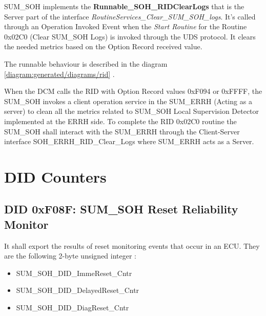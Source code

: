 {
SUM\_SOH implements the \textbf{Runnable\_SOH\_RIDClearLogs} that is the Server part of the interface \textit{RoutineServices\_Clear\_SUM\_SOH\_logs}. It's called through
an Operation Invoked Event when the \textit{Start Routine} for the Routine 0x02C0 (Clear SUM\_SOH Logs) is invoked through the UDS protocol.
It clears the needed metrics based on the Option Record received value. 

The runnable behaviour is described in the diagram \ref{diagram:generated/diagrams/rid} .

}
{
       
}

{ 
When the DCM calls the RID with Option Record values 0xF094 or 0xFFFF, the SUM\_SOH invokes a client operation service in the SUM\_ERRH (Acting as a server) to clean all the metrics related to SUM\_SOH Local Supervision Detector implemented at the ERRH side. To complete the RID 0x02C0 routine the SUM\_SOH shall interact with the SUM\_ERRH through the Client-Server interface SOH\_ERRH\_RID\_Clear\_Logs where SUM\_ERRH acts as a Server. }
{
}


\section{DID Counters}
\subsection{DID 0xF08F: SUM_SOH Reset Reliability Monitor}

{
It shall export the results of reset  monitoring events that occur in an ECU. 
They are the following 2-byte unsigned integer :

\begin{itemize}
\item	SUM\_SOH\_DID\_ImmeReset\_Cntr
\item	SUM\_SOH\_DID\_DelayedReset\_Cntr
\item	SUM\_SOH\_DID\_DiagReset\_Cntr
\end{itemize}

}
{
}



